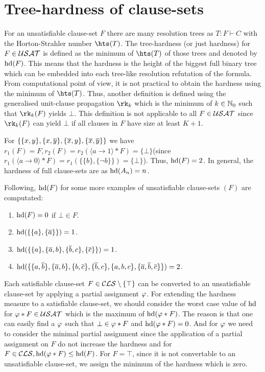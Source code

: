 \documentclass[]{book}
\begin{document}
\section{Tree-hardness of clause-sets}
\label{sec:Hardnessunsat}

For an unsatisfiable clause-set $F$ there are many resolution trees as $T : F \vdash C$ with the Horton-Strahler number $\hts(T)$. The tree-hardness (or just hardness) for $F \in \mathcal{USAT}$ is defined as the minimum of $\hts(T)$ of those trees and denoted by $\operatorname{hd}(F)$. This means that the hardness is the height of the biggest full binary tree which can be embedded into each tree-like resolution refutation of the formula. From computational point of view, it is not practical to obtain the hardness using the minimum of $\hts(T)$. Thus, another definition is defined using the generalised unit-clause propagation $\rk_k$ which is the minimum of $k \in \mathbb{N}_0$ such that $\rk_k(F)$ yields $\bot$. This definition is not applicable to all $F \in \mathcal{USAT}$ since $\rk_k(F)$ can yield $\bot$ if all clauses in $F$ have size at least $K+1$.

\begin{examp}\label{exp:harducls}
  For $\{ \{ x,y \},\{ x,\overline{y} \},\{ \overline{x},y \},\{ \overline{x},\overline{y} \} \}$ we have $r_1(F)=F, r_2(F)=r_2( \langle a \rightarrow 1 \rangle * F) = \{ \bot \}$(since $r_1( \langle a \rightarrow 0 \rangle * F)=r_1 (\{\{ b \}, \{ \neg b \}\}) = \{ \bot \}$). Thus, $\operatorname{hd}(F) = 2$. In general, the hardness of full clause-sets are as $\operatorname{hd}(A_n)=n$.
  
  Following, $\operatorname{hd}(F)$ for some more examples of unsatisfiable clause-sets $(F)$ are computated:
  \begin{enumerate}
  \item $\operatorname{hd}(F) = 0$ if $\bot \in F$.
  \item $\operatorname{hd}(\{ \{ a \},\{ \overline{a} \} \}) = 1$.
  \item $\operatorname{hd}(\{ \{ a \},\{ \overline{a},b \}, \{ \overline{b},c \}, \{ \overline{c} \} \}) = 1$.
  \item $\operatorname{hd}(\{ \{ a,\overline{b} \},\{ \overline{a},b \},\{ b,\overline{c} \},\{ \overline{b},c \},\{ a,b,c \},\{ \overline{a},\overline{b},\overline{c} \} \}) = 2$.
  \end{enumerate}
\end{examp}

Each satisfiable clause-set $F \in \mathcal{CLS} \setminus \{ \top \}$ can be converted to an unsatisfiable clause-set by applying a partial assignment $\varphi$. For extending the hardness measure to a satisfiable clause-set, we should consider the worst case value of $\operatorname{hd}$ for $\varphi * F \in \mathcal{USAT}$ which is the maximum of $\operatorname{hd}(\varphi * F)$. The reason is that one can easily find a $\varphi$ such that $\bot \in \varphi * F$ and $\operatorname{hd}(\varphi * F)=0$. And for $\varphi$ we need to consider the minimal partial assignment since the application of a partial assignment on $F$ do not increase the hardness and for $F \in \mathcal{CLS}, \operatorname{hd}(\varphi * F) \leq \operatorname{hd}(F)$. For $F = \top$, since it is not convertable to an unsatisfiable clause-set, we assign the minimum of the hardness which is zero.
\end{document}
